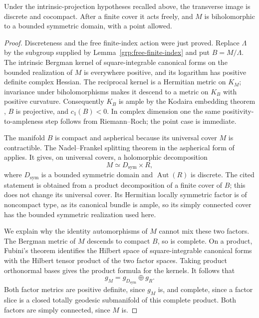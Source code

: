 \begin{theorem}\label{grp:discrete-symmetric}
Under the intrinsic-projection hypotheses recalled above, the transverse
image is discrete and cocompact.  After a finite cover it acts freely,
and $M$ is biholomorphic to a bounded symmetric domain, with a point
allowed.
\end{theorem}

\begin{proof}
Discreteness and the free finite-index action were just proved.
Replace $\Lambda$ by the subgroup supplied by
Lemma~\ref{grp:free-finite-index} and put $B=M/\Lambda$.
The intrinsic Bergman kernel of square-integrable canonical forms on
the bounded realization of $M$ is everywhere positive, and its logarithm
has positive definite complex Hessian.  The reciprocal kernel is a
Hermitian metric on $K_M$; invariance under biholomorphisms makes it
descend to a metric on $K_B$ with positive curvature.  Consequently
$K_B$ is ample by the Kodaira embedding theorem
\cite[\S\S1--2; see also \S4]{Kodaira1954PNAS}, $B$ is projective,
and $c_1(B)<0$. In complex dimension one the same positivity-to-ampleness
step follows from Riemann--Roch; the point case is immediate.

The manifold $B$ is compact and aspherical because its universal cover
$M$ is contractible.  The Nadel--Frankel splitting theorem in the
aspherical form of \cite[Theorem~1.10]{FarbWeinberger2008} applies.
It gives, on universal covers, a holomorphic decomposition
\[
 M\simeq D_{\mathrm{sym}}\times R,
\]
where $D_{\mathrm{sym}}$ is a bounded symmetric domain and
$\operatorname{Aut}(R)$ is discrete.  The cited statement is obtained
from a product decomposition of a finite cover of $B$; this does not
change its universal cover.  Its Hermitian locally symmetric factor is
of noncompact type, as its canonical bundle is ample, so its simply
connected cover has the bounded symmetric realization used here.

We explain why the identity automorphisms of $M$ cannot mix these two
factors.  The Bergman metric of $M$ descends to compact $B$, so is
complete.  On a product, Fubini's theorem identifies the Hilbert space
of square-integrable canonical forms with the Hilbert tensor product
of the two factor spaces.  Taking product orthonormal bases gives the
product formula for the kernels.  It follows that
\[
 g_M=g_{D_{\mathrm{sym}}}\oplus g_R.
\]
Both factor metrics are positive definite, since $g_M$ is, and complete,
since a factor slice is a closed totally geodesic submanifold of this
complete product.  Both factors are simply connected, since $M$ is.


\end{proof}
